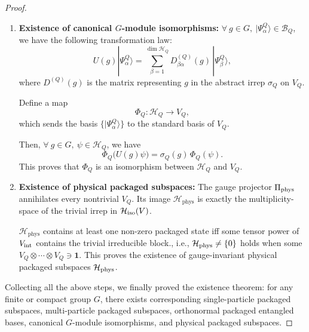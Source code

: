 \documentclass[12pt,a4paper]{article}
\begin{document}
\begin{proof}
\begin{enumerate}
		A packaged product vector in bi-partition $\mathcal H_A\otimes\mathcal H_B$ has Schmidt rank 1, whereas any nontrivial packaged superposition of two orthogonal packaged product vectors must have Schmidt rank 2.
		Hence, a nontrivial packaged superposition of linearly independent packaged product states cannot itself be a product:
		it is necessarily packaged entangled.
		Applying Gram-Schmidt procedure \cite{HoffmanKunze1971} to any generating set of such packaged superpositions then produces an orthonormal packaged entangled basis
		$\mathcal{B}_Q$ (Eq.~(\ref{EQ:OrthonormalBasisOfPackagedEntangledStates})).
				
		\item \textbf{Existence of canonical $G$-module isomorphisms:}  
		$\forall ~ g \in G, ~ |\Psi^Q_\alpha\rangle \in \mathcal{B}_Q$, we have the following transformation law:
		\[
		U(g)|\Psi^Q_\alpha\rangle = \sum_{\beta=1}^{\dim \mathcal{H}_Q} D^{(Q)}_{\beta\alpha}(g)\, |\Psi^Q_\beta\rangle,
		\]
		where $D^{(Q)}(g)$ is the matrix representing $g$ in the abstract irrep $\sigma_Q$ on $V_Q$.
		
		Define a map
		\[
		\Phi_Q: \mathcal{H}_Q \to V_Q,
		\]
		which sends the basis $\{|\Psi^Q_\alpha\rangle\}$ to the standard basis of $V_Q$.
		
		Then, $ \forall ~ g \in G, ~ \psi \in \mathcal{H}_Q$, we have
		\[
		\Phi_Q\bigl(U(g)\psi\bigr) = \sigma_Q(g)\,\Phi_Q(\psi).
		\]
		This proves that $\Phi_Q$ is an isomorphism between $\mathcal{H}_Q$ and $V_Q$.
		
		\item \textbf{Existence of physical packaged subspaces:}	
		The gauge projector $\Pi_{\rm phys}$ annihilates every nontrivial $V_Q$.
		Its image $\mathcal H_{\text{phys}}$ is exactly the multiplicity-space of the trivial irrep in $\mathcal{H}_{\rm iso}(V)$.
		
		
		
		$\mathcal H_{\text{phys}}$ contains at least one non-zero packaged state iff some tensor power of $V_{\rm int}$ contains the trivial irreducible block., i.e., $\mathcal{H}_{\rm phys} \ne \{0\}$ holds when some $V_Q \otimes \cdots \otimes V_Q \ni \mathbf 1$.
		This proves the existence of gauge-invariant physical packaged subspaces $\mathcal H_{\rm phys}$.
	\end{enumerate}
	
	Collecting all the above steps, we finally proved the existence theorem:
	for any finite or compact group $G$, there exists corresponding single-particle packaged subspaces, multi-particle packaged subspaces, orthonormal packaged entangled bases, canonical $G$-module isomorphisms, and physical packaged subspaces.
\end{proof}
\end{document}
